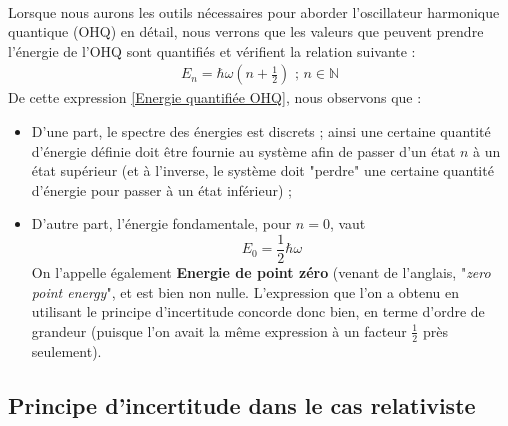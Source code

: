 \documentclass[../Notes de cours]{subfiles}
\begin{document}
\paragraph{} Lorsque nous aurons les outils nécessaires pour aborder l'oscillateur harmonique quantique (OHQ) en détail, nous verrons que les valeurs que peuvent prendre l'énergie de l'OHQ sont quantifiés et vérifient la relation suivante :
\begin{align}
\label{Energie quantifiée OHQ}
E_n = \hbar \omega \left( n + \frac{1}{2} \right) \mbox{ ; $n \in \mathbb{N} $}
\end{align}
De cette expression \ref{Energie quantifiée OHQ}, nous observons que : 
\begin{itemize}[label=\textbullet]
    \item D'une part, le spectre des énergies est discrets ; ainsi une certaine quantité d'énergie définie doit être fournie au système afin de passer d'un état $n$ à un état supérieur (et à l'inverse, le système doit "perdre" une certaine quantité d'énergie pour passer à un état inférieur) ; 
    \item D'autre part, l'énergie fondamentale, pour $n=0$, vaut $$ E_0 = \frac{1}{2} \hbar \omega $$
    On l'appelle également \textbf{Energie de point zéro} (venant de l'anglais, "\textit{zero point energy}", et est bien non nulle. 
    \newline L'expression que l'on a obtenu en utilisant le principe d'incertitude concorde donc bien, en terme d'ordre de grandeur (puisque l'on avait la même expression à un facteur $\frac{1}{2}$ près seulement). 
\end{itemize} 

\subsection{Principe d'incertitude dans le cas relativiste}
\end{document}
